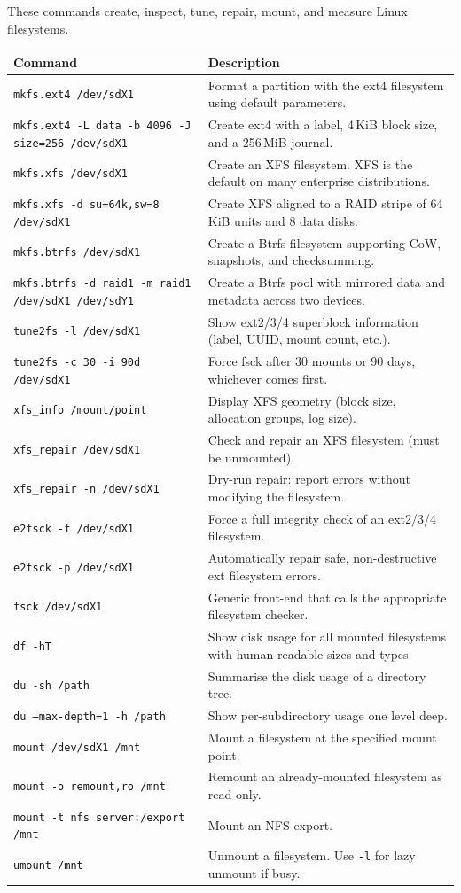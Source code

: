 These commands create, inspect, tune, repair, mount, and measure Linux
filesystems.

\begin{longtable}{p{4cm} p{8cm}}
\toprule
\textbf{Command} & \textbf{Description} \\
\midrule
\endhead
\texttt{mkfs.ext4 /dev/sdX1} & Format a partition with the ext4 filesystem using default parameters. \\
\texttt{mkfs.ext4 -L data -b 4096 -J size=256 /dev/sdX1} & Create ext4 with a label, 4\,KiB block size, and a 256\,MiB journal. \\
\texttt{mkfs.xfs /dev/sdX1} & Create an XFS filesystem. XFS is the default on many enterprise distributions. \\
\texttt{mkfs.xfs -d su=64k,sw=8 /dev/sdX1} & Create XFS aligned to a RAID stripe of 64\,KiB units and 8 data disks. \\
\texttt{mkfs.btrfs /dev/sdX1} & Create a Btrfs filesystem supporting CoW, snapshots, and checksumming. \\
\texttt{mkfs.btrfs -d raid1 -m raid1 /dev/sdX1 /dev/sdY1} & Create a Btrfs pool with mirrored data and metadata across two devices. \\
\texttt{tune2fs -l /dev/sdX1} & Show ext2/3/4 superblock information (label, UUID, mount count, etc.). \\
\texttt{tune2fs -c 30 -i 90d /dev/sdX1} & Force fsck after 30 mounts or 90 days, whichever comes first. \\
\texttt{xfs\_info /mount/point} & Display XFS geometry (block size, allocation groups, log size). \\
\texttt{xfs\_repair /dev/sdX1} & Check and repair an XFS filesystem (must be unmounted). \\
\texttt{xfs\_repair -n /dev/sdX1} & Dry-run repair: report errors without modifying the filesystem. \\
\texttt{e2fsck -f /dev/sdX1} & Force a full integrity check of an ext2/3/4 filesystem. \\
\texttt{e2fsck -p /dev/sdX1} & Automatically repair safe, non-destructive ext filesystem errors. \\
\texttt{fsck /dev/sdX1} & Generic front-end that calls the appropriate filesystem checker. \\
\texttt{df -hT} & Show disk usage for all mounted filesystems with human-readable sizes and types. \\
\texttt{du -sh /path} & Summarise the disk usage of a directory tree. \\
\texttt{du --max-depth=1 -h /path} & Show per-subdirectory usage one level deep. \\
\texttt{mount /dev/sdX1 /mnt} & Mount a filesystem at the specified mount point. \\
\texttt{mount -o remount,ro /mnt} & Remount an already-mounted filesystem as read-only. \\
\texttt{mount -t nfs server:/export /mnt} & Mount an NFS export. \\
\texttt{umount /mnt} & Unmount a filesystem. Use \texttt{-l} for lazy unmount if busy. \\
\bottomrule
\end{longtable}

